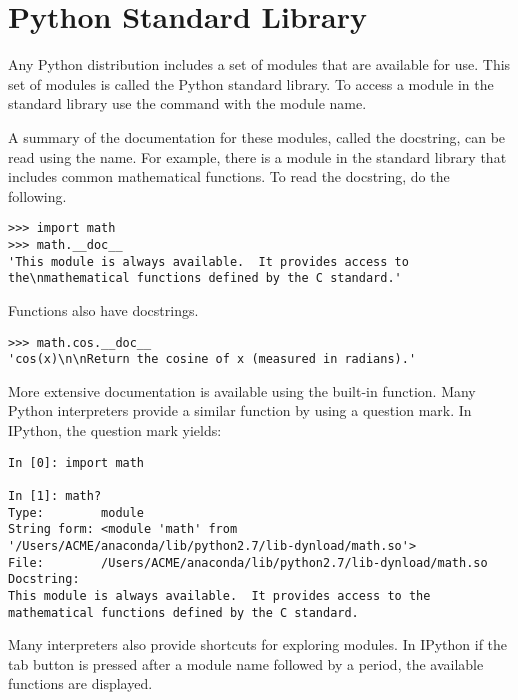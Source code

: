 \section*{Python Standard Library}

Any Python distribution includes a set of modules that are available for use.
This set of modules is called the Python standard library.
To access a module in the standard library use the  command with the module name.

A summary of the documentation for these modules, called the docstring, can be read using the  name.
For example, there is a  module in the standard library that includes common mathematical functions.
To read the docstring, do the following.
\begin{lstlisting}
>>> import math
>>> math.__doc__
'This module is always available.  It provides access to the\nmathematical functions defined by the C standard.'
\end{lstlisting}
Functions also have docstrings.
\begin{lstlisting}
>>> math.cos.__doc__
'cos(x)\n\nReturn the cosine of x (measured in radians).'
\end{lstlisting}

More extensive documentation is available using the  built-in function.
Many Python interpreters provide a similar function by using a question mark.
In IPython, the question mark yields:

\begin{lstlisting}
In [0]: import math

In [1]: math?
Type:        module
String form: <module 'math' from '/Users/ACME/anaconda/lib/python2.7/lib-dynload/math.so'>
File:        /Users/ACME/anaconda/lib/python2.7/lib-dynload/math.so
Docstring:
This module is always available.  It provides access to the
mathematical functions defined by the C standard.
\end{lstlisting}

Many interpreters also provide shortcuts for exploring modules.
In IPython if the tab button is pressed after a module name followed by a period, the available functions are displayed.

